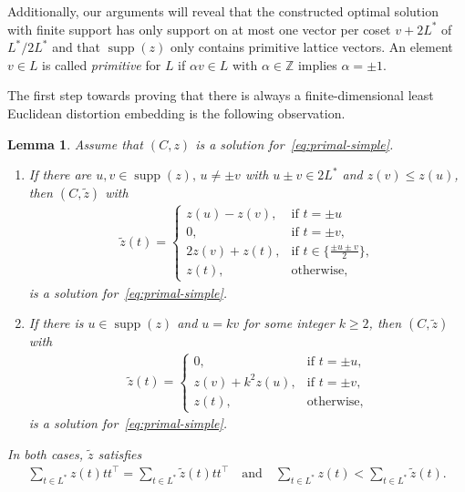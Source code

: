\documentclass{amsart}
\newtheorem{lemma}[defin]{Lemma}
\newcommand{\Z}{\mathbb{Z}}
\DeclareMathOperator{\supp}{supp}
\begin{document}
Additionally, our arguments will reveal that the constructed optimal
solution with finite support has only support on at most one vector
per coset $ v+2L^* $ of $ L^*/2L^* $ and that $ \supp(z) $ only
contains primitive lattice vectors.  An element $v \in L$ is called
\emph{primitive} for $L$ if $\alpha v \in L$ with $\alpha \in \Z$
implies $\alpha = \pm 1$.

The first step towards proving that there is always a finite-dimensional least Euclidean distortion embedding is the following observation.
\begin{lemma}\label{lemma:support-decrease-simple}
	Assume that $ (C,z) $ is a solution for~\eqref{eq:primal-simple}.
	\begin{enumerate}
		\item  If there are $ u, v \in \supp(z), \, u \neq \pm v$ with $ u\pm v \in 2L^* $ and $ z(v) \le z(u) $, then $ (C,\tilde{z}) $ with
		\begin{align*}
			\tilde{z}( t) = \begin{cases}
				z(u) - z(v), &\text{if } t=  \pm u  \\
				0, &\text{if } t = \pm v,  \\
				2z(v)+ z(t), &\text{if } t  \in \{\frac{\pm u \pm v}{2} \},    \\
				z(t), &\text{otherwise,}
			\end{cases}
		\end{align*}
		is a solution for~\eqref{eq:primal-simple}.
		\item  If there is $ u \in \supp(z) $ and $ u = kv  $ for some integer $ k \ge 2 $,
		then $ (C,\tilde{z}) $ with
		\begin{align*}
			\tilde{z}(t) = \begin{cases}
				 0,&\text{if } t = \pm u,  \\
				 z(v) + k^2z(u), &\text{if } t =\pm
				  v,  \\
				z(t), &\text{otherwise,}
			\end{cases}
		\end{align*}
		is a solution for~\eqref{eq:primal-simple}.
	\end{enumerate}
	In both cases, $ \tilde{z} $ satisfies
	\begin{align*}
		\sum_{t \in L^*} z(t) tt^\mathsf{\top} = \sum_{t \in L^*} \tilde{z}(t) tt^\mathsf{\top} \quad \text{and} \quad \sum_{t \in L^*} z(t) < \sum_{t \in L^*} \tilde{z}(t).
	\end{align*}
\end{lemma}
\end{document}
